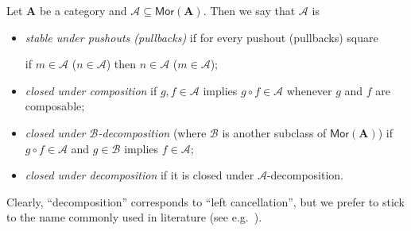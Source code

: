 \documentclass[runningheads,envcountsect]{lmcs}
\newcommand{\catname}[1]{\mathbf{#1}}
\newcommand{\arr}[1]{\mathsf{Mor}(\catname{#1})}
\theoremstyle{plain}
\theoremstyle{definition}
\begin{document}
\begin{defi}Let $\catname{A}$ be a category and $\mathcal{A}\subseteq \arr{A}$. Then we say that  $\mathcal{A}$ is
\begin{itemize}
	\item 
		\emph{stable under pushouts (pullbacks)} if for every pushout (pullbacks) square 
		\begin{center}
		\end{center} if $m \in \mathcal{A}$ ($n\in \mathcal{A}$) then $n \in \mathcal{A}$ ($m \in \mathcal{A}$);
	\item \emph{closed under composition} if $g, f\in \mathcal{A}$ implies $g\circ f\in \mathcal{A}$ whenever $g$ and $f$ are composable;
	\item \emph{closed under $\mathcal{B}$-decomposition} (where $\mathcal{B}$ is another subclass of $\arr{A}$) if $g\circ f\in \mathcal{A}$ and $g\in \mathcal{B}$ implies $f\in \mathcal{A}$;
	\item \emph{closed under decomposition} if it is closed under $\mathcal{A}$-decomposition.
\end{itemize}
\end{defi}
\begin{rem}Clearly, ``decomposition'' corresponds to ``left cancellation'', but we prefer to stick to the name commonly used in literature (see e.g.~\cite{habel2012mathcal}).
\end{rem}
\end{document}
